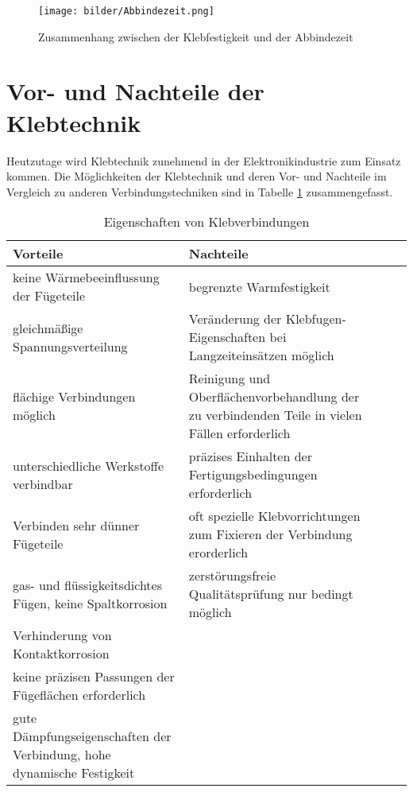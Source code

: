 \begin{figure}[H]
\begin{center}
\texttt{[image: bilder/Abbindezeit.png]}
\caption{Zusammenhang zwischen der Klebfestigkeit und der Abbindezeit}
\label{fig:Abbindezeit}
\end{center}
\end{figure}


\section{Vor- und Nachteile der Klebtechnik}

Heutzutage wird Klebtechnik zunehmend in der Elektronikindustrie zum Einsatz kommen. Die Möglichkeiten der Klebtechnik und deren Vor- und Nachteile im Vergleich zu anderen Verbindungstechniken sind in Tabelle \ref{tab:Klebtechnik} zusammengefasst.

\begin{table}[H]
    \begin{tabular}{p{7cm}|p{8.2cm}l|l}
    \hline
    {\bf Vorteile} & {\bf Nachteile} \\
    \hline
        keine Wärmebeeinflussung der Fügeteile & begrenzte Warmfestigkeit \\
       \hline
         gleichmäßige Spannungsverteilung & Veränderung der Klebfugen-Eigenschaften bei Langzeiteinsätzen möglich\\
        \hline
         flächige Verbindungen möglich & Reinigung und Oberflächenvorbehandlung der zu verbindenden Teile in vielen Fällen erforderlich\\
         \hline
         unterschiedliche Werkstoffe verbindbar & präzises Einhalten der Fertigungsbedingungen erforderlich\\
         \hline
         Verbinden sehr dünner Fügeteile & oft spezielle Klebvorrichtungen zum Fixieren der Verbindung erorderlich\\
         \hline
         gas- und flüssigkeitsdichtes Fügen, keine Spaltkorrosion & zerstörungsfreie Qualitätsprüfung nur bedingt möglich\\
         \hline
         Verhinderung von Kontaktkorrosion & \\
         \hline
         keine präzisen Passungen der Fügeflächen erforderlich &\\
         \hline
         gute Dämpfungseigenschaften der Verbindung, hohe dynamische Festigkeit &\\
    \hline
    \end{tabular}
    \caption{Eigenschaften von Klebverbindungen}
    \label{tab:Klebtechnik}
\end{table}

